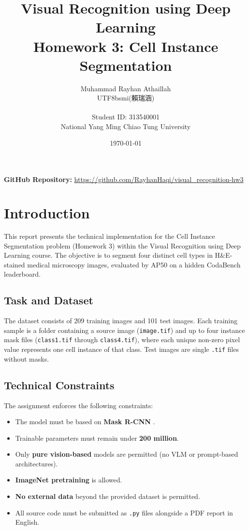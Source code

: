 \documentclass[12pt, a4paper]{article}
\title{\textbf{Visual Recognition using Deep Learning}\\ \large Homework 3: Cell Instance Segmentation}
\author{
    Muhammad Rayhan Athaillah \begin{CJK*}{UTF8}{bsmi}(賴瑞涵)\end{CJK*}\\
    \small Student ID: 313540001\\
    \small National Yang Ming Chiao Tung University
}
\date{\today}
\begin{document}
\maketitle

\vspace{0.5cm}
\noindent \textbf{GitHub Repository:} \href{https://github.com/RayhanHaqi/visual\_recognition-hw3}{https://github.com/RayhanHaqi/visual\_recognition-hw3}

\section{Introduction}
This report presents the technical implementation for the Cell Instance Segmentation problem (Homework 3) within the Visual Recognition using Deep Learning course. The objective is to segment four distinct cell types in H\&E-stained medical microscopy images, evaluated by AP50 on a hidden CodaBench leaderboard.

\subsection{Task and Dataset}
The dataset consists of 209 training images and 101 test images. Each training sample is a folder containing a source image (\texttt{image.tif}) and up to four instance mask files (\texttt{class1.tif} through \texttt{class4.tif}), where each unique non-zero pixel value represents one cell instance of that class. Test images are single \texttt{.tif} files without masks.

\subsection{Technical Constraints}
The assignment enforces the following constraints:
\begin{itemize}
    \item The model must be based on \textbf{Mask R-CNN} \cite{he2017}.
    \item Trainable parameters must remain under \textbf{200 million}.
    \item Only \textbf{pure vision-based} models are permitted (no VLM or prompt-based architectures).
    \item \textbf{ImageNet pretraining} is allowed.
    \item \textbf{No external data} beyond the provided dataset is permitted.
    \item All source code must be submitted as \texttt{.py} files alongside a PDF report in English.
\end{itemize}
\end{document}
